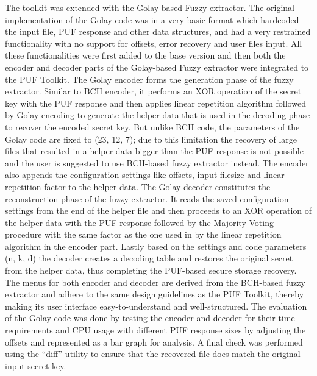 The toolkit was extended with the Golay-based Fuzzy extractor. The original implementation of the Golay code was in a very basic format which hardcoded the input file, PUF response and other data structures, and had a very restrained functionality with no support for offsets, error recovery and user files input. All these functionalities were first added to the base version and then both the encoder and decoder parts of the Golay-based Fuzzy extractor were integrated to the PUF Toolkit. The
Golay encoder forms the generation phase of the fuzzy extractor. Similar to BCH encoder, it performs an XOR operation of the secret key with the PUF response and then applies linear repetition algorithm followed by Golay encoding to generate the helper data that is used in the decoding phase to recover the encoded secret key. But unlike BCH code, the parameters of the Golay code are fixed to (23, 12, 7); due to this limitation the recovery of large files that resulted in a helper data bigger than
the PUF response is not possible and the user is suggested to use BCH-based fuzzy extractor instead. The encoder also appends the configuration settings like offsets, input filesize and linear repetition factor to the helper data. The Golay decoder constitutes the reconstruction phase of the fuzzy extractor. It reads the saved configuration settings from the end of the helper file and then proceeds to an XOR operation of the helper data with the PUF response followed by the Majority Voting procedure with the same factor as the one used in by the linear repetition algorithm in the encoder part. Lastly based on the settings and code parameters (n, k, d) the decoder creates a decoding table and restores the original secret from the helper data, thus completing the PUF-based secure storage recovery. The menus for both encoder and decoder are derived from the BCH-based fuzzy extractor and
adhere to the same design guidelines as the PUF Toolkit, thereby making its user interface easy-to-understand and well-structured. The evaluation of the Golay code was done by testing the encoder and decoder for their time requirements and CPU usage with different PUF response sizes by adjusting the offsets and represented as a bar graph for analysis. A final check was performed using the ``diff'' utility to ensure that the recovered file does match the original input secret key.


